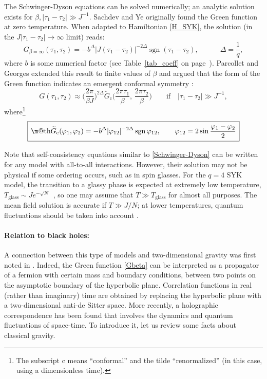\documentclass[12pt]{article}
\makeatletter
\newcommand*{\wideboxed}[1]{\setlength{\fboxsep}{1ex}%
  \fbox{\m@th$\displaystyle#1$}}
\DeclareMathOperator{\sgn}{sgn}
\newcommand{\cc}{\mathrm{c}}
\newcommand{\tG}{\widetilde{G}}
\newcommand{\vp}{\varphi}
\makeatother
\begin{document}
The Schwinger-Dyson equations can be solved numerically; an analytic solution exists for $\beta,|\tau_1-\tau_2|\gg J^{-1}$. Sachdev and Ye \cite{SaYe93} originally found the Green function at zero temperature. When adapted to Hamiltonian \eqref{H_SYK}, the solution (in the $J|\tau_1-\tau_2|\to \infty$ limit) reads:
\begin{equation}\label{Ginfty}
G_{\beta=\infty}(\tau_1,\tau_2)=
-b^{\Delta}\bigl|J(\tau_1-\tau_2)\bigr|^{-2\Delta} \sgn(\tau_1-\tau_2),
\qquad\quad \Delta=\frac{1}{q},
\end{equation}
where $b$ is some numerical factor (see Table~\ref{tab_coeff} on page~\pageref{tab_coeff}). Parcollet and Georges extended this result to finite values of $\beta$ and argued that the form of the Green function indicates an emergent conformal symmetry \cite{PaGe99}:
\begin{equation}\label{Gbeta}
G(\tau_1,\tau_2)
\approx\biggl(\frac{2\pi}{\beta J}\biggr)^{2\Delta}
\tG_{\cc}\biggl(\frac{2\pi\tau_1}{\beta},\,\frac{2\pi\tau_2}{\beta}\biggr)\qquad
\text{if}\quad |\tau_1-\tau_2|\gg J^{-1},
\end{equation}
where\footnote{The subscript $\cc$ means ``conformal'' and the tilde ``renormalized'' (in this case, using a dimensionless time).}\vspace{-5pt}
\begin{equation}\label{Gc}
\wideboxed{
\tG_{\cc}(\vp_1,\vp_2)
=-b^{\Delta}|\vp_{12}|^{-2\Delta} \sgn\vp_{12},\qquad
\vp_{12}=2\sin\frac{\vp_1-\vp_2}{2}
}
\end{equation}

Note that self-consistency equations similar to \eqref{Schwinger-Dyson} can be written for any model with all-to-all interactions. However, their solution may not be physical if some ordering occurs, such as in spin glasses. For the $q=4$ SYK model, the transition to a glassy phase is expected at extremely low temperature, $T_{\text{glass}}\sim Je^{-\sqrt{N}}$\, \cite{GePaSa00}, so one may assume that $T\gg T_{\text{glass}}$ for almost all purposes. The mean field solution is accurate if $T\gg J/N$; at lower temperatures, quantum fluctuations should be taken into account \cite{BaAlKa16}.

\paragraph{Relation to black holes:}
A connection between this type of models and two-dimensional gravity was first noted in \cite{Sach10}. Indeed, the Green function \eqref{Gbeta} can be interpreted as a propagator of a fermion with certain mass and boundary conditions, between two points on the asymptotic boundary of the hyperbolic plane. Correlation functions in real (rather than imaginary) time are obtained by replacing the hyperbolic plane with a two-dimensional anti-de Sitter space. More recently, a holographic correspondence has been found that involves the dynamics and quantum fluctuations of space-time. To introduce it, let us review some facts about classical gravity.
\end{document}
